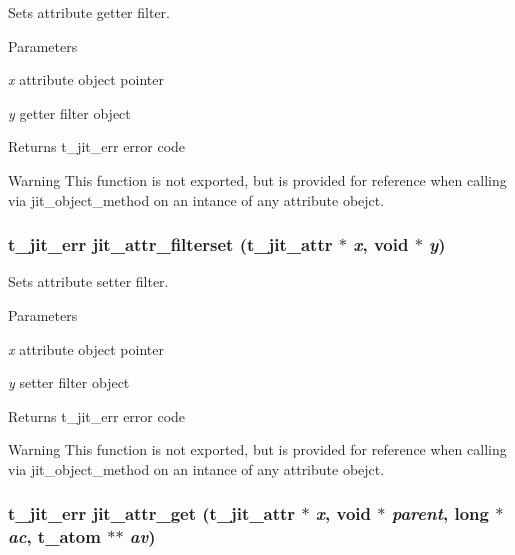 Sets attribute getter filter. 
\begin{DoxyParams}{Parameters}
\item[{\em x}]attribute object pointer \item[{\em y}]getter filter object\end{DoxyParams}
\begin{DoxyReturn}{Returns}
t\_\-jit\_\-err error code
\end{DoxyReturn}
\begin{DoxyWarning}{Warning}
This function is not exported, but is provided for reference when calling via jit\_\-object\_\-method on an intance of any attribute obejct. 
\end{DoxyWarning}
\hypertarget{group__attrmod_gaa407b91c0f3a0084a20d4fab325a69ac}{
\subsubsection[{jit\_\-attr\_\-filterset}]{\setlength{\rightskip}{0pt plus 5cm}t\_\-jit\_\-err jit\_\-attr\_\-filterset ({\bf t\_\-jit\_\-attr} $\ast$ {\em x}, \/  void $\ast$ {\em y})}}
\label{group__attrmod_gaa407b91c0f3a0084a20d4fab325a69ac}


Sets attribute setter filter. 
\begin{DoxyParams}{Parameters}
\item[{\em x}]attribute object pointer \item[{\em y}]setter filter object\end{DoxyParams}
\begin{DoxyReturn}{Returns}
t\_\-jit\_\-err error code
\end{DoxyReturn}
\begin{DoxyWarning}{Warning}
This function is not exported, but is provided for reference when calling via jit\_\-object\_\-method on an intance of any attribute obejct. 
\end{DoxyWarning}
\hypertarget{group__attrmod_gab54f36f1cbdbdbb08ee83826ac3b47e5}{
\subsubsection[{jit\_\-attr\_\-get}]{\setlength{\rightskip}{0pt plus 5cm}t\_\-jit\_\-err jit\_\-attr\_\-get ({\bf t\_\-jit\_\-attr} $\ast$ {\em x}, \/  void $\ast$ {\em parent}, \/  long $\ast$ {\em ac}, \/  {\bf t\_\-atom} $\ast$$\ast$ {\em av})}}
\label{group__attrmod_gab54f36f1cbdbdbb08ee83826ac3b47e5}


